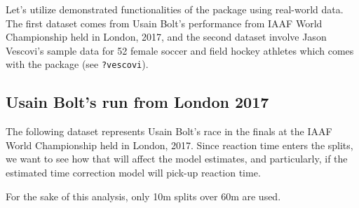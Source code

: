 \documentclass[
]{jss}
\begin{document}
Let's utilize demonstrated functionalities of the  package using real-world data. The first dataset comes from Usain Bolt's performance from IAAF World Championship held in London, 2017, and the second dataset involve Jason Vescovi's sample data for 52 female soccer and field hockey athletes which comes with the  package (see \texttt{?vescovi}).

\hypertarget{usain-bolts-run-from-london-2017}{%
\subsection{Usain Bolt's run from London 2017}\label{usain-bolts-run-from-london-2017}}

The following dataset represents Usain Bolt's race in the finals at the IAAF World Championship held in London, 2017. Since reaction time enters the splits, we want to see how that will affect the model estimates, and particularly, if the estimated time correction model will pick-up reaction time.

For the sake of this analysis, only 10m splits over 60m are used.
\end{document}
